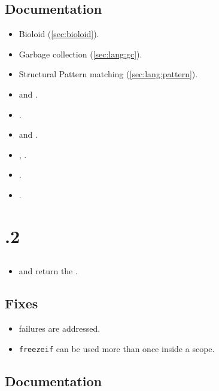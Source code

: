 \subsection{Documentation}
\begin{itemize}
\item Bioloid (\autoref{sec:bioloid}).
\item Garbage collection (\autoref{sec:lang:gc}).
\item Structural Pattern matching (\autoref{sec:lang:pattern}).
\item {} and .
\item {}.
\item {} and .
\item {}, .
\item {}.
\item {}.
\end{itemize}

\section{.2}

\subsection{\us}
\begin{itemize}
\item {} and  return the
  .
\end{itemize}

\subsection{Fixes}
\begin{itemize}
\item {} failures are addressed.
\item \lstinline|freezeif| can be used more than once inside a scope.
\end{itemize}

\subsection{Documentation}

